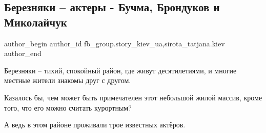  
 
 
 
 
 
\subsection{Березняки – актеры - Бучма, Брондуков и Миколайчук}
\label{sec:06_11_2021.fb.fb_group.story_kiev_ua.1.bereznjaki_aktery_buchma_brondukov_mykolajchuk}
 
\ifcmt
 author_begin
   author_id fb_group.story_kiev_ua,sirota_tatjana.kiev
 author_end
\fi


Березняки – тихий, спокойный район, где живут десятилетиями, и многие местные
жители знакомы друг с другом.

Казалось бы, чем может быть примечателен этот небольшой жилой массив, кроме
того, что его можно считать курортным?

А ведь в этом районе проживали трое известных актёров.

